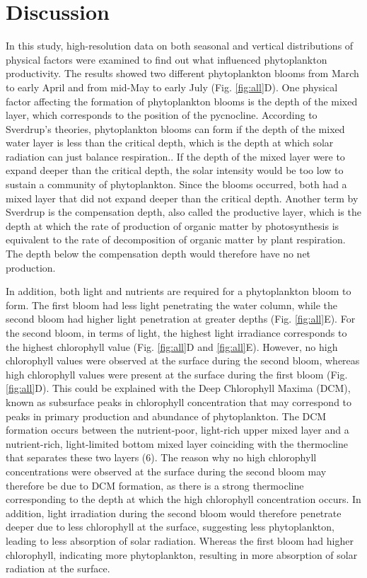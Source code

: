 \documentclass[../Main.tex]{subfiles}
\begin{document}
\section*{\crule[blue]{.3cm}{.3cm} Discussion}
In this study, high-resolution data on both seasonal and vertical distributions of physical factors were examined to find out what influenced phytoplankton productivity. The results showed two different phytoplankton blooms from March to early April and from mid-May to early July (Fig. \ref{fig:all}D). One physical factor affecting the formation of phytoplankton blooms is the depth of the mixed layer, which corresponds to the position of the pycnocline.  
According to Sverdrup's theories, phytoplankton blooms can form if the depth of the mixed water layer is less than the critical depth, which is the depth at which solar radiation can just balance respiration.\supercite{Sverdrup1953OnCF}. If the depth of the mixed layer were to expand deeper than the critical depth, the solar intensity would be too low to sustain a community of phytoplankton. Since the blooms occurred, both had a mixed layer that did not expand deeper than the critical depth. Another term by Sverdrup is the compensation depth, also called the productive layer, which is the depth at which the rate of production of organic matter by photosynthesis is equivalent to the rate of decomposition of organic matter by plant respiration\supercite{Sverdrup1953OnCF}. 
The depth below the compensation depth would therefore have no net production. 

In addition, both light and nutrients are required for a phytoplankton bloom to form\supercite{munkes2021cyanobacteria}. 
The first bloom had less light penetrating the water column, while the second bloom had higher light penetration at greater depths (Fig. \ref{fig:all}E). For the second bloom, in terms of light, the highest light irradiance corresponds to the highest chlorophyll value (Fig. \ref{fig:all}D and \ref{fig:all}E). 
However, no high chlorophyll values were observed at the surface during the second bloom, whereas high chlorophyll values were present at the surface during the first bloom (Fig. \ref{fig:all}D). This could be explained with the Deep Chlorophyll Maxima (DCM), known as subsurface peaks in chlorophyll concentration that may correspond to peaks in primary production and abundance of phytoplankton. The DCM formation occurs between the nutrient-poor, light-rich upper mixed layer and a nutrient-rich, light-limited bottom mixed layer coinciding with the thermocline that separates these two layers (6). The reason why no high chlorophyll concentrations were observed at the surface during the second bloom may therefore be due to DCM formation, as there is a strong thermocline corresponding to the depth at which the high chlorophyll concentration occurs. In addition, light irradiation during the second bloom would therefore penetrate deeper due to less chlorophyll at the surface, suggesting less phytoplankton, leading to less absorption of solar radiation. Whereas the first bloom had higher chlorophyll, indicating more phytoplankton, resulting in more absorption of solar radiation at the surface. 
\end{document}
